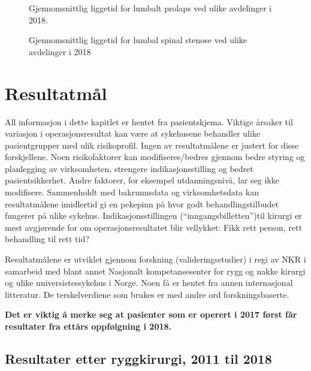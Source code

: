 \documentclass [norsk,a4paper,twoside]{article}\usepackage[]{graphicx}\usepackage[]{color}
\begin{document}
\begin{figure}[h] 
\caption{Gjennomsnittlig liggetid for lumbalt prolaps ved ulike avdelinger i 2018. } 
\label{fig:LiggetidAvdPro}
\end{figure}

\begin{figure}[h] 
\caption{Gjennomsnittlig liggetid for lumbal spinal stenose ved ulike avdelinger i 2018 } 
\label{fig:LiggetidAvdSS}
\end{figure}


      
      
      
      
      \clearpage

\section{Resultatmål}
All informasjon i dette kapitlet er hentet fra pasientskjema.  Viktige årsaker til variasjon i operasjonsresultat kan være at sykehusene behandler
ulike pasientgrupper med ulik risikoprofil. Ingen av resultatmålene er justert
for disse forskjellene. Noen risikofaktorer kan modifiseres/bedres gjennom bedre styring og planlegging av
virksomheten, strengere indikasjonsstilling og bedret pasientsikkerhet. Andre faktorer, for eksempel utdanningsnivå, lar seg ikke modifisere.
Sammenholdt med bakrunnsdata og virksomhetsdata kan resultatmålene imidlertid gi en pekepinn på hvor godt behandlingstilbudet fungerer på ulike sykehus. 
Indikasjonsstillingen (``inngangsbilletten'')til kirurgi er mest avgjørende for om operasjonsresultatet blir vellykket: Fikk rett person, rett
behandling til rett tid?

Resultatmålene er utviklet gjennom forskning (valideringsstudier) i regi av NKR i samarbeid
med blant annet Nasjonalt kompetansesenter for rygg og nakke kirurgi og ulike universistessykehus i Norge. Noen få er hentet fra annen
internasjonal litteratur. De terskelverdiene som brukes er med andre ord forskningsbaserte.
 
\textbf{Det er viktig å merke seg at pasienter som er operert i 2017 først får resultater fra ettårs oppfølgning i 2018.} 


      
      


      
      \subsection{ Resultater etter ryggkirurgi, 2011 til 2018}
\end{document}
